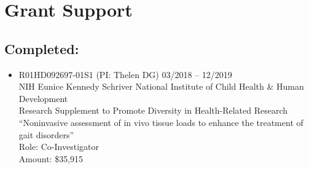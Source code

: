 \documentclass[letterpaper, 10pt]{article}
\begin{document}
\section{Grant Support}



\subsection{Completed:}
\begin{itemize}
    \item[] R01HD092697-01S1 (PI: Thelen DG) \hfill 03/2018 -- 12/2019
    \\NIH Eunice Kennedy Schriver National Institute of Child Health \& Human Development
    \\Research Supplement to Promote Diversity in Health-Related Research
    \\“Noninvasive assessment of in vivo tissue loads to enhance the treatment of gait disorders”
    \\Role: Co-Investigator
    \\Amount: \$35,915

\end{itemize}

\end{document}
